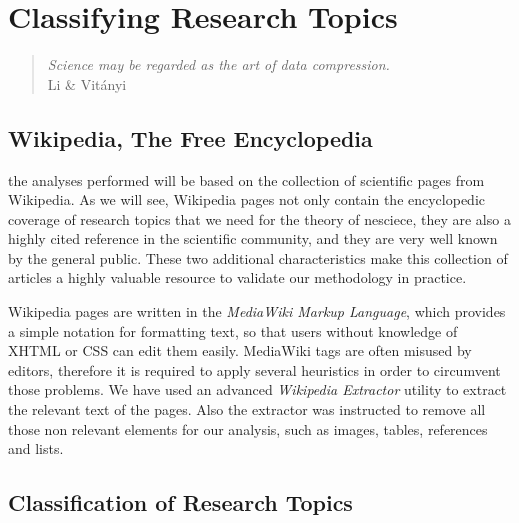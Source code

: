 %
%


\chapter{Classifying Research Topics}
\label{chap:philosophy-science}

\begin{quote}
\begin{flushright}
\emph{Science may be regarded as the art of data compression.}\\
Li \& Vitányi
\end{flushright}
\end{quote}
\bigskip

%
%

\section{Wikipedia, The Free Encyclopedia}

the analyses performed will be based on the collection of scientific pages from Wikipedia. As we will see, Wikipedia pages not only contain the encyclopedic coverage of research topics that we need for the theory of nesciece, they are also a highly cited reference in the scientific community, and they are very well known by the general public. These two additional characteristics make this collection of articles a highly valuable resource to validate our methodology in practice.



Wikipedia pages are written in the \emph{MediaWiki Markup Language}, which provides a simple notation for formatting text, so that users without knowledge of XHTML or CSS can edit them easily. MediaWiki tags are often misused by editors, therefore it is required to apply several heuristics in order to circumvent those problems. We have used an advanced \emph{Wikipedia Extractor} utility to extract the relevant text of the pages. Also the extractor was instructed to remove all those non relevant elements for our analysis, such as images, tables, references and lists. 

%
%

\section{Classification of Research Topics}
\label{sec:Classification_Research_Topics}


